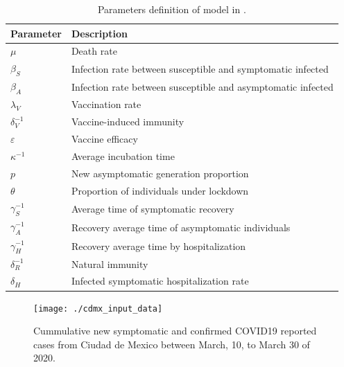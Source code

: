 \begin{table}[h!]
	\centering
	\begin{tabular}{>{\centering}%
        p{}%
        p{}
    }
		\toprule
		\textbf{Parameter} & \textbf{Description}
  	\\
  	\midrule
		$\mu$ &
			Death rate
		\\
        $\beta_S$ &
        	Infection rate between susceptible and symptomatic infected
		\\
        $\beta_A$ &
        	Infection rate between susceptible and asymptomatic infected
		\\
        $\lambda_V$ &
        	Vaccination rate
		\\
        $\delta_{V}^{-1}$ &
        Vaccine-induced immunity
		\\
        $\varepsilon$ &
        	Vaccine efficacy
		\\
        $\kappa^{-1}$ &
        	Average incubation time
        \\
		$p$ &
			New asymptomatic generation proportion
		\\
	    $\theta$ &
        	Proportion of individuals under lockdown
        \\
        $\gamma_{S}^{-1}$ &
        	Average time of symptomatic recovery
        \\
		$\gamma_{A}^{-1}$ &
			Recovery average time of asymptomatic individuals
		\\
		$\gamma_{H}^{-1}$ &
			Recovery average time by hospitalization
		\\
        $\delta_{R}^{-1}$ &
        	Natural immunity
  		\\
  		$\delta_{H}$ &
        	Infected symptomatic hospitalization rate
  		\\
  	\bottomrule
	\end{tabular}
		\caption{
			Parameters definition of model in
			.}
    \label{tbl:dynamics_base_parameters}
\end{table}
%
\begin{figure}[htb]
    \centering
    \texttt{[image: ./cdmx\_input\_data]}
    \caption{%
        Cummulative new symptomatic and confirmed COVID19 reported cases from
        Ciudad de Mexico between March, 10, to March 30 of 2020.
    }
    \label{fig:data_CDMX}
\end{figure}
%
